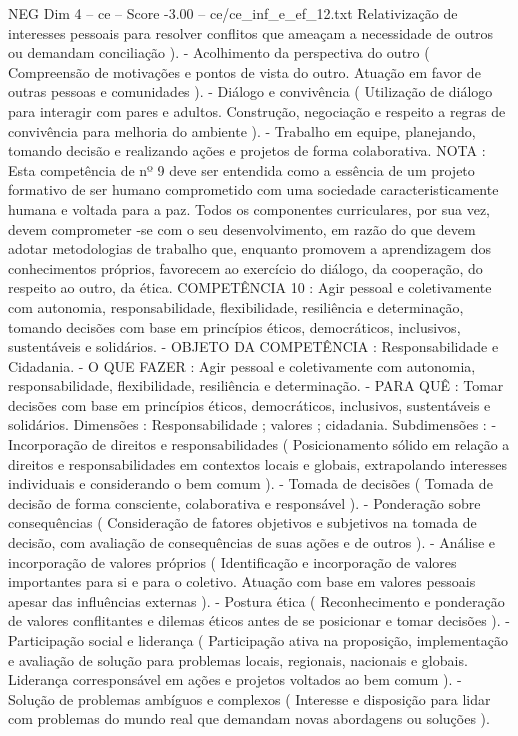 \begin{textsample}{NEG Dim 4 – ce – Score -3.00 – ce/ce\_inf\_e\_ef\_12.txt}
Relativização de interesses pessoais para resolver conflitos que ameaçam a necessidade de outros ou demandam conciliação ). - Acolhimento da perspectiva do outro ( Compreensão de motivações e pontos de vista do outro.
Atuação em favor de outras pessoas e comunidades ). - Diálogo e convivência ( Utilização de diálogo para interagir com pares e adultos.
Construção, negociação e respeito a regras de convivência para melhoria do ambiente ). - Trabalho em equipe, planejando, tomando decisão e realizando ações e projetos de forma colaborativa.
NOTA : Esta competência de nº 9 deve ser entendida como a essência de um projeto formativo de ser humano comprometido com uma sociedade caracteristicamente humana e voltada para a paz.
Todos os componentes curriculares, por sua vez, devem comprometer -se com o seu desenvolvimento, em razão do que devem adotar metodologias de trabalho que, enquanto promovem a aprendizagem dos conhecimentos próprios, favorecem ao exercício do diálogo, da cooperação, do respeito ao outro, da ética.
COMPETÊNCIA 10 : Agir pessoal e coletivamente com autonomia, responsabilidade, flexibilidade, resiliência e determinação, tomando decisões com base em princípios éticos, democráticos, inclusivos, sustentáveis e solidários. - OBJETO DA COMPETÊNCIA : Responsabilidade e Cidadania. - O QUE FAZER : Agir pessoal e coletivamente com autonomia, responsabilidade, flexibilidade, resiliência e determinação. - PARA QUÊ : Tomar decisões com base em princípios éticos, democráticos, inclusivos, sustentáveis e solidários.
Dimensões : Responsabilidade ; valores ; cidadania.
Subdimensões : - Incorporação de direitos e responsabilidades ( Posicionamento sólido em relação a direitos e responsabilidades em contextos locais e globais, extrapolando interesses individuais e considerando o bem comum ). - Tomada de decisões ( Tomada de decisão de forma consciente, colaborativa e responsável ). - Ponderação sobre consequências ( Consideração de fatores objetivos e subjetivos na tomada de decisão, com avaliação de consequências de suas ações e de outros ). - Análise e incorporação de valores próprios ( Identificação e incorporação de valores importantes para si e para o coletivo.
Atuação com base em valores pessoais apesar das influências externas ). - Postura ética ( Reconhecimento e ponderação de valores conflitantes e dilemas éticos antes de se posicionar e tomar decisões ). - Participação social e liderança ( Participação ativa na proposição, implementação e avaliação de solução para problemas locais, regionais, nacionais e globais.
Liderança corresponsável em ações e projetos voltados ao bem comum ). - Solução de problemas ambíguos e complexos ( Interesse e disposição para lidar com problemas do mundo real que demandam novas abordagens ou soluções ).

\end{textsample}
